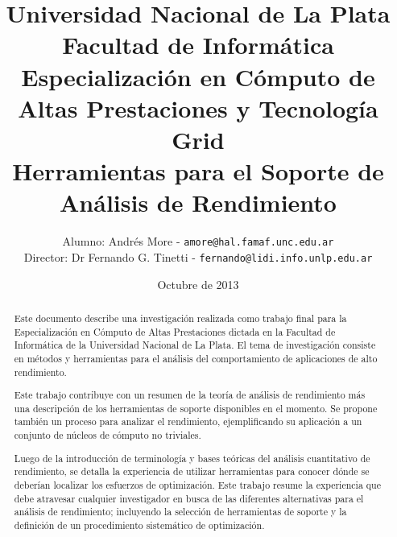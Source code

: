 \documentclass[a4paper]{report}
\begin{document}
\renewcommand{\tablename}{Tabla}

\title{Universidad Nacional de La Plata\\Facultad de Informática\\ \bigskip
  Especialización en Cómputo de Altas Prestaciones y Tecnología Grid\\ \bigskip
  Herramientas para el Soporte de Análisis de Rendimiento}

\author{
  Alumno: Andrés More - {\tt amore@hal.famaf.unc.edu.ar}\\
  Director: Dr Fernando G. Tinetti - {\tt fernando@lidi.info.unlp.edu.ar}
}

\date{Octubre de 2013}

\maketitle

\begin{abstract}

 Este documento describe una investigación realizada como trabajo final para la Especialización en Cómputo de Altas Prestaciones dictada en la Facultad de Informática de la Universidad Nacional de La Plata. El tema de investigación consiste en métodos y herramientas para el análisis del comportamiento de aplicaciones de alto rendimiento.

  \bigskip

  Este trabajo contribuye con un resumen de la teoría de análisis de rendimiento más una descripción de los herramientas de soporte 
  disponibles en el momento. Se propone también un proceso para analizar el rendimiento, ejemplificando su aplicación a un conjunto de núcleos de
  cómputo no triviales.

\bigskip

  Luego de la introducción de terminología y bases teóricas del análisis cuantitativo de rendimiento, se detalla la experiencia de utilizar herramientas para conocer dónde se deberían localizar los esfuerzos de optimización.  Este trabajo resume la experiencia que debe atravesar cualquier investigador en busca de las diferentes alternativas para el análisis de rendimiento; incluyendo la selección de herramientas de soporte y la definición de un procedimiento sistemático de optimización.

  \bigskip

\end{abstract}

\tableofcontents
\end{document}
